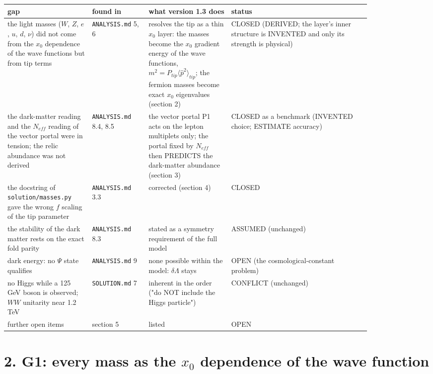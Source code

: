 \documentclass[11pt]{article}
\begin{document}
\begin{longtable}{>{\raggedright\arraybackslash}p{0.198\linewidth}>{\raggedright\arraybackslash}p{0.137\linewidth}>{\raggedright\arraybackslash}p{0.198\linewidth}>{\raggedright\arraybackslash}p{0.320\linewidth}}
\toprule
\textbf{gap} & \textbf{found in} & \textbf{what version 1.3 does} & \textbf{status} \\
\midrule
the light masses ($W$, $Z$, $e$, $u$, $d$, $\nu$) did not come from the $x_0$ dependence of the wave functions but from tip terms & \texttt{ANALYSIS.\allowbreak{}md} 5, 6 & resolves the tip as a thin $x_0$ layer: the masses become the $x_0$ gradient energy of the wave functions, $m^2 = P_{tip}\langle\hat p^2\rangle_{tip}$; the fermion masses become exact $x_0$ eigenvalues (section 2) & CLOSED (DERIVED; the layer's inner structure is INVENTED and only its strength is physical) \\
the dark-matter reading and the $N_{eff}$ reading of the vector portal were in tension; the relic abundance was not derived & \texttt{ANALYSIS.\allowbreak{}md} 8.4, 8.5 & the vector portal P1 acts on the lepton multiplets only; the portal fixed by $N_{eff}$ then PREDICTS the dark-matter abundance (section 3) & CLOSED as a benchmark (INVENTED choice; ESTIMATE accuracy) \\
the docstring of \texttt{solution/\allowbreak{}masses.\allowbreak{}py} gave the wrong $f$ scaling of the tip parameter & \texttt{ANALYSIS.\allowbreak{}md} 3.3 & corrected (section 4) & CLOSED \\
the stability of the dark matter rests on the exact fold parity & \texttt{ANALYSIS.\allowbreak{}md} 8.3 & stated as a symmetry requirement of the full model & ASSUMED (unchanged) \\
dark energy: no $\Psi$ state qualifies & \texttt{ANALYSIS.\allowbreak{}md} 9 & none possible within the model: $\delta\Lambda$ stays & OPEN (the cosmological-constant problem) \\
no Higgs while a 125 GeV boson is observed; $WW$ unitarity near 1.2 TeV & \texttt{SOLUTION.\allowbreak{}md} 7 & inherent in the order ("do NOT include the Higgs particle") & CONFLICT (unchanged) \\
further open items & section 5 & listed & OPEN \\
\bottomrule
\end{longtable}

\section*{2. G1: every mass as the $x_0$ dependence of the wave function}
\end{document}
